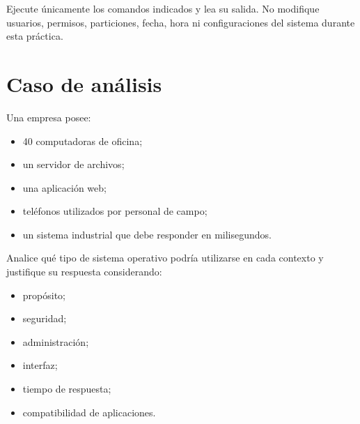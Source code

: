 \documentclass[
  spanish,
  letterpaper,
]{scrbook}
\providecommand{\tightlist}{%
  \setlength{\itemsep}{0pt}\setlength{\parskip}{0pt}}
\begin{document}
\begin{tcolorbox}[enhanced jigsaw, arc=.35mm, bottomrule=.15mm, bottomtitle=1mm, breakable, colback=white, colbacktitle=quarto-callout-warning-color!10!white, colframe=quarto-callout-warning-color-frame, coltitle=black, left=2mm, leftrule=.75mm, opacityback=0, opacitybacktitle=0.6, rightrule=.15mm, title=\textcolor{quarto-callout-warning-color}{\faExclamationTriangle}\hspace{0.5em}{Regla del laboratorio}, titlerule=0mm, toprule=.15mm, toptitle=1mm]

Ejecute únicamente los comandos indicados y lea su salida. No modifique
usuarios, permisos, particiones, fecha, hora ni configuraciones del
sistema durante esta práctica.

\end{tcolorbox}


\chapter{Caso de análisis}\label{caso-de-anuxe1lisis}

Una empresa posee:

\begin{itemize}
\tightlist
\item
  40 computadoras de oficina;
\item
  un servidor de archivos;
\item
  una aplicación web;
\item
  teléfonos utilizados por personal de campo;
\item
  un sistema industrial que debe responder en milisegundos.
\end{itemize}

Analice qué tipo de sistema operativo podría utilizarse en cada contexto
y justifique su respuesta considerando:

\begin{itemize}
\tightlist
\item
  propósito;
\item
  seguridad;
\item
  administración;
\item
  interfaz;
\item
  tiempo de respuesta;
\item
  compatibilidad de aplicaciones.
\end{itemize}

\end{document}
